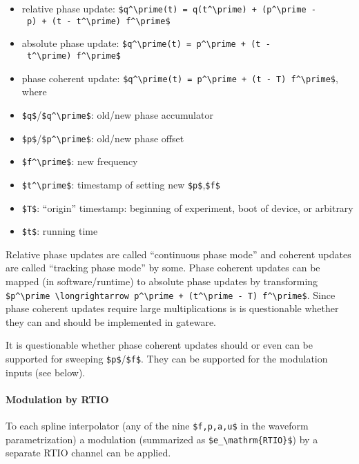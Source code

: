 \begin{itemize}
	\item
	relative phase update:
	\texttt{\$q\^{}\textbackslash{}prime(t)\ =\ q(t\^{}\textbackslash{}prime)\ +\ (p\^{}\textbackslash{}prime\ -\ p)\ +\ (t\ -\ t\^{}\textbackslash{}prime)\ f\^{}\textbackslash{}prime\$}
	\item
	absolute phase update:
	\texttt{\$q\^{}\textbackslash{}prime(t)\ =\ p\^{}\textbackslash{}prime\ +\ (t\ -\ t\^{}\textbackslash{}prime)\ f\^{}\textbackslash{}prime\$}
	\item
	phase coherent update:
	\texttt{\$q\^{}\textbackslash{}prime(t)\ =\ p\^{}\textbackslash{}prime\ +\ (t\ -\ T)\ f\^{}\textbackslash{}prime\$},
	where
	\item
	\texttt{\$q\$}/\texttt{\$q\^{}\textbackslash{}prime\$}: old/new phase
	accumulator
	\item
	\texttt{\$p\$}/\texttt{\$p\^{}\textbackslash{}prime\$}: old/new phase
	offset
	\item
	\texttt{\$f\^{}\textbackslash{}prime\$}: new frequency
	\item
	\texttt{\$t\^{}\textbackslash{}prime\$}: timestamp of setting new
	\texttt{\$p\$},\texttt{\$f\$}
	\item
	\texttt{\$T\$}: ``origin'' timestamp: beginning of experiment, boot of
	device, or arbitrary
	\item
	\texttt{\$t\$}: running time
\end{itemize}

Relative phase updates are called ``continuous phase mode'' and coherent
updates are called ``tracking phase mode'' by some. Phase coherent
updates can be mapped (in software/runtime) to absolute phase updates by
transforming
\texttt{\$p\^{}\textbackslash{}prime\ \textbackslash{}longrightarrow\ p\^{}\textbackslash{}prime\ +\ (t\^{}\textbackslash{}prime\ -\ T)\ f\^{}\textbackslash{}prime\$}.
Since phase coherent updates require large multiplications is is
questionable whether they can and should be implemented in gateware.

It is questionable whether phase coherent updates should or even can be
supported for sweeping \texttt{\$p\$}/\texttt{\$f\$}. They can be
supported for the modulation inputs (see below).

\paragraph{Modulation by RTIO}\label{modulation-by-rtio}

To each spline interpolator (any of the nine \texttt{\$f,p,a,u\$} in the
waveform parametrization) a modulation (summarized as
\texttt{\$e\_\textbackslash{}mathrm\{RTIO\}\$}) by a separate RTIO
channel can be applied.

